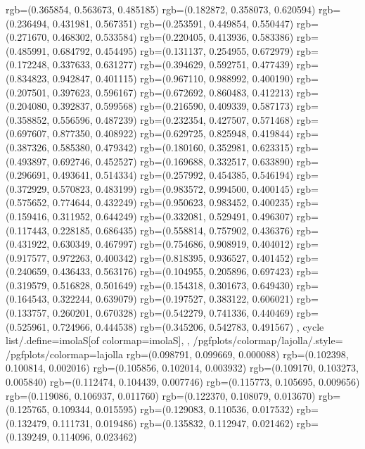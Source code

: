 {{{					rgb=(0.365854, 0.563673, 0.485185)
					rgb=(0.182872, 0.358073, 0.620594)
					rgb=(0.236494, 0.431981, 0.567351)
					rgb=(0.253591, 0.449854, 0.550447)
					rgb=(0.271670, 0.468302, 0.533584)
					rgb=(0.220405, 0.413936, 0.583386)
					rgb=(0.485991, 0.684792, 0.454495)
					rgb=(0.131137, 0.254955, 0.672979)
					rgb=(0.172248, 0.337633, 0.631277)
					rgb=(0.394629, 0.592751, 0.477439)
					rgb=(0.834823, 0.942847, 0.401115)
					rgb=(0.967110, 0.988992, 0.400190)
					rgb=(0.207501, 0.397623, 0.596167)
					rgb=(0.672692, 0.860483, 0.412213)
					rgb=(0.204080, 0.392837, 0.599568)
					rgb=(0.216590, 0.409339, 0.587173)
					rgb=(0.358852, 0.556596, 0.487239)
					rgb=(0.232354, 0.427507, 0.571468)
					rgb=(0.697607, 0.877350, 0.408922)
					rgb=(0.629725, 0.825948, 0.419844)
					rgb=(0.387326, 0.585380, 0.479342)
					rgb=(0.180160, 0.352981, 0.623315)
					rgb=(0.493897, 0.692746, 0.452527)
					rgb=(0.169688, 0.332517, 0.633890)
					rgb=(0.296691, 0.493641, 0.514334)
					rgb=(0.257992, 0.454385, 0.546194)
					rgb=(0.372929, 0.570823, 0.483199)
					rgb=(0.983572, 0.994500, 0.400145)
					rgb=(0.575652, 0.774644, 0.432249)
					rgb=(0.950623, 0.983452, 0.400235)
					rgb=(0.159416, 0.311952, 0.644249)
					rgb=(0.332081, 0.529491, 0.496307)
					rgb=(0.117443, 0.228185, 0.686435)
					rgb=(0.558814, 0.757902, 0.436376)
					rgb=(0.431922, 0.630349, 0.467997)
					rgb=(0.754686, 0.908919, 0.404012)
					rgb=(0.917577, 0.972263, 0.400342)
					rgb=(0.818395, 0.936527, 0.401452)
					rgb=(0.240659, 0.436433, 0.563176)
					rgb=(0.104955, 0.205896, 0.697423)
					rgb=(0.319579, 0.516828, 0.501649)
					rgb=(0.154318, 0.301673, 0.649430)
					rgb=(0.164543, 0.322244, 0.639079)
					rgb=(0.197527, 0.383122, 0.606021)
					rgb=(0.133757, 0.260201, 0.670328)
					rgb=(0.542279, 0.741336, 0.440469)
					rgb=(0.525961, 0.724966, 0.444538)
					rgb=(0.345206, 0.542783, 0.491567)
			},
		cycle list/.define={imolaS}{[of colormap=imolaS]},
		},
		/pgfplots/colormap/lajolla/.style={
			/pgfplots/colormap={lajolla}{%
					rgb=(0.098791, 0.099669, 0.000088)
					rgb=(0.102398, 0.100814, 0.002016)
					rgb=(0.105856, 0.102014, 0.003932)
					rgb=(0.109170, 0.103273, 0.005840)
					rgb=(0.112474, 0.104439, 0.007746)
					rgb=(0.115773, 0.105695, 0.009656)
					rgb=(0.119086, 0.106937, 0.011760)
					rgb=(0.122370, 0.108079, 0.013670)
					rgb=(0.125765, 0.109344, 0.015595)
					rgb=(0.129083, 0.110536, 0.017532)
					rgb=(0.132479, 0.111731, 0.019486)
					rgb=(0.135832, 0.112947, 0.021462)
					rgb=(0.139249, 0.114096, 0.023462)
}}}
